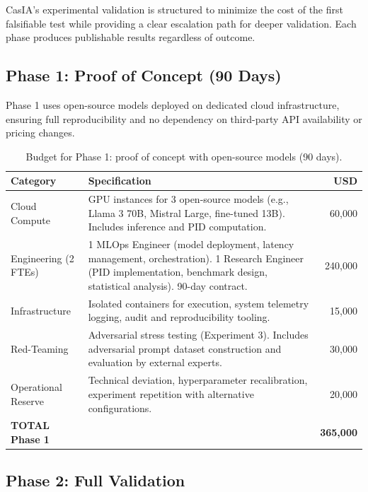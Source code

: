 \documentclass[11pt,a4paper]{article}
\theoremstyle{remark}
\begin{document}
CasIA's experimental validation is structured to minimize the cost of the first falsifiable test while providing a clear escalation path for deeper validation. Each phase produces publishable results regardless of outcome.

\subsection{Phase 1: Proof of Concept (90 Days)}

Phase 1 uses open-source models deployed on dedicated cloud infrastructure, ensuring full reproducibility and no dependency on third-party API availability or pricing changes.

\begin{table}[H]
\centering
\begin{tabular}{@{}p{4cm}p{6.5cm}r@{}}
\toprule
\textbf{Category} & \textbf{Specification} & \textbf{USD} \\
\midrule
Cloud Compute & GPU instances for 3 open-source models (e.g., Llama 3 70B, Mistral Large, fine-tuned 13B). Includes inference and PID computation. & 60,000 \\
\addlinespace
Engineering (2 FTEs) & 1 MLOps Engineer (model deployment, latency management, orchestration). 1 Research Engineer (PID implementation, benchmark design, statistical analysis). 90-day contract. & 240,000 \\
\addlinespace
Infrastructure & Isolated containers for execution, system telemetry logging, audit and reproducibility tooling. & 15,000 \\
\addlinespace
Red-Teaming & Adversarial stress testing (Experiment 3). Includes adversarial prompt dataset construction and evaluation by external experts. & 30,000 \\
\addlinespace
Operational Reserve & Technical deviation, hyperparameter recalibration, experiment repetition with alternative configurations. & 20,000 \\
\midrule
\textbf{TOTAL Phase 1} & & \textbf{365,000} \\
\bottomrule
\end{tabular}
\caption{Budget for Phase 1: proof of concept with open-source models (90 days).}
\label{tab:budget}
\end{table}

\subsection{Phase 2: Full Validation}
\end{document}
